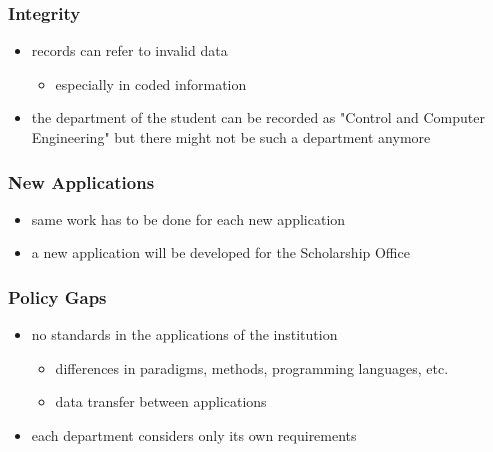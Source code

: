\documentclass[dvipsnames]{beamer}
\theoremstyle{plain}
\begin{document}
\begin{frame}
  \frametitle{Integrity}

  \begin{itemize}
    \item records can refer to invalid data
    \begin{itemize}
      \item especially in coded information
    \end{itemize}
  \end{itemize}

  \pause
  \begin{example}
    \begin{itemize}
      \item the department of the student can be recorded as "Control and
        Computer Engineering" but there might not be such a department anymore
    \end{itemize}
  \end{example}
\end{frame}

\begin{frame}
  \frametitle{New Applications}

  \begin{itemize}
    \item same work has to be done for each new application
  \end{itemize}

  \pause
  \begin{example}
    \begin{itemize}
      \item a new application will be developed for the Scholarship Office
    \end{itemize}
  \end{example}
\end{frame}

\begin{frame}
  \frametitle{Policy Gaps}

  \begin{itemize}
    \item no standards in the applications of the institution
    \begin{itemize}
      \item differences in paradigms, methods, programming languages, etc.
      \item data transfer between applications
    \end{itemize}

    \pause
    \item each department considers only its own requirements
  \end{itemize}
\end{frame}
\end{document}
